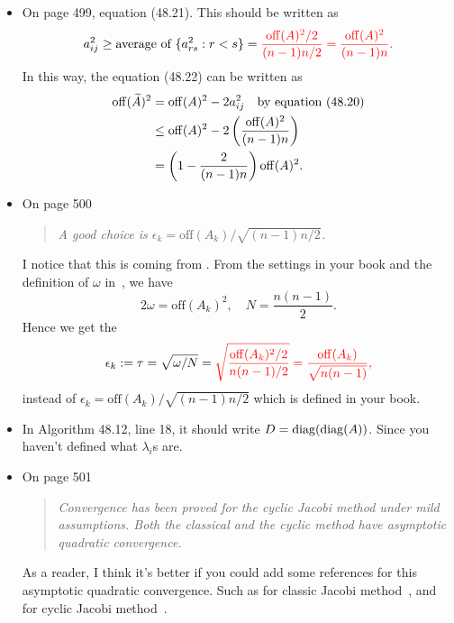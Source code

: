 \documentclass{article}
\begin{document}
\maketitle
\thispagestyle{firstpage} 


\begin{itemize}
    \item On page 499, equation (48.21). This should be written as 
    \begin{equation}\notag
        a_{ij}^2 \geq \text{average of }\{a_{rs}^2: r< s\} = 
        {\color{red} \frac{\mathrm{off}(A)^2/2}{(n-1)n/2} = \frac{\mathrm{off}(A)^2}{(n-1)n}.}
    \end{equation}
    In this way, the equation (48.22) can be written as 
    \begin{equation}\notag
        \begin{aligned}
            \mathrm{off}(\widetilde A)^2 & = \mathrm{off}(A)^2 - 2a_{ij}^2
            \quad \text{by equation (48.20)}\\
            & \leq \mathrm{off}(A)^2 - 2 \left(\frac{\mathrm{off}(A)^2}{(n-1)n} \right) \\
            & = \left( 1- \frac{2}{(n-1)n}\right)\mathrm{off}(A)^2.
        \end{aligned}
    \end{equation}
    \item On page 500
    \begin{quotation}
        \itshape 
        A good choice is $\epsilon_k = \mathrm{off}(A_k)/\sqrt{(n-1)n/2}$.
    \end{quotation}
    I notice that this is coming from . From the settings in your book and
    the definition of $\omega$ in~\cite{Par1998TSEP}, we have 
    $$
        2\omega = \mathrm{off}(A_k)^2,\quad N = \frac{n(n-1)}{2}.
    $$
    Hence we get the 
    $$
        \epsilon_k := \tau = \sqrt{\omega/N} = 
        {\color{red} \sqrt{\frac{\mathrm{off}(A_k)^2/2}{{n(n-1)}/2}} = \frac{\mathrm{off}(A_k)}{\sqrt{n(n-1)}},}
    $$
    instead of $\epsilon_k = \mathrm{off}(A_k)/\sqrt{(n-1)n/2}$ which is
    defined in your book.
    \item 
    In Algorithm 48.12, line 18, it should write $D = \operatorname{diag}(\operatorname{diag}(A))$.
    Since you haven't defined what $\lambda_i$s are.
    \item On page 501
    \begin{quotation}
        \itshape 
        Convergence has been proved for the cyclic Jacobi method under mild assumptions. Both the classical and the cyclic method have asymptotic quadratic convergence.
    \end{quotation}
    As a reader, I think it's better if you could add
    some references for this 
    asymptotic quadratic convergence. Such as for classic Jacobi
    method~\cite{vKem1966OtCotCJMfRSMwNDE}, and for cyclic Jacobi
    method~\cite{1966-quadratic-convergence-vanKempen,
    Wil1962NotQCotCJP}.
\end{itemize}






\newpage 


\end{document}
